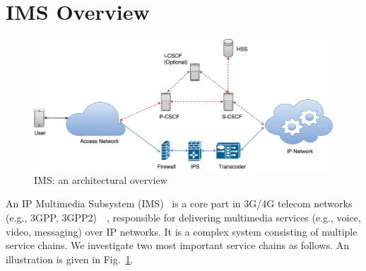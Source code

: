 \section{IMS Overview} \label{sec:scalims-background}
\begin{figure}[!h]
        \centering
        \includegraphics[width=1\columnwidth]{chap-scalims/figure/IMS_architecture.eps}
        \caption{IMS: an architectural overview}
        \label{fig:IMS_architecture}
\end{figure}

An IP Multimedia Subsystem (IMS)~\cite{3gpp-ims} is a core part in 3G/4G telecom networks (e.g., 3GPP, 3GPP2)~\cite{umts}~\cite{lte}, responsible for delivering multimedia services (e.g., voice, video, messaging) over IP networks. It is a complex system consisting of multiple service chains. We investigate two most important service chains as follows. An illustration is given in Fig.~\ref{fig:IMS_architecture}.

